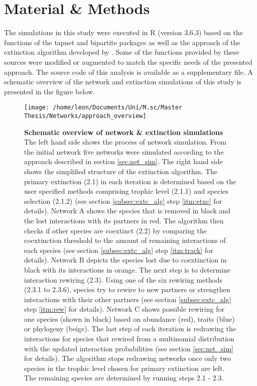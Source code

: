 \documentclass[12pt,a4paper]{article}
\begin{document}
	\section{Material \& Methods}
	The simulations in this study were executed in R \parencite{RCT2020} (version 3.6.3) based on the functions of the tapnet \parencite{Benadi2022} and bipartite \parencite{Dormann2008} packages as well as the approach of the extinction algorithm developed by \citeauthor{Vizentin-Bugoni2019} \parencite{Vizentin-Bugoni2019}. Some of the functions provided by these sources were modified or augmented to match the specific needs of the presented approach. The source code of this analysis is available as a supplementary file. A schematic overview of the network and extinction simulations of this study is presented in the figure below.	
	
	\begin{figure}[H]
	 \texttt{[image: /home/leon/Documents/Uni/M.sc/Master Thesis/Networks/approach\_overview]}
	 \caption[Schematic overview of network \& extinction simulations]{\textbf{Schematic overview of network \& extinction simulations} The left hand side shows the process of network simulation. From the initial network five networks were simulated according to the approach described in section \ref{sec:net_sim}. The right hand side shows the simplified structure of the extinction algorithm. The primary extinction (2.1) in each iteration is determined based on the user specified methods comprising trophic level (2.1.1) and species selection (2.1.2) (see section \ref{subsec:extc_alg} step \ref{itm:etxc} for details). Network A shows the species that is removed in black and the lost interactions with its partners in red. The algorithm then checks if other species are coextinct (2.2) by comparing the coextinction threshold to the amount of remaining interactions of each species (see section \ref{subsec:extc_alg} step \ref{itm:track} for details). Network B depicts the species lost due to coextinction in black with its interactions in orange. The next step is to determine interaction rewiring (2.3). Using one of the six rewiring methods (2.3.1 to 2.3.6), species try to rewire to new partners or strengthen interactions with their other partners (see section \ref{subsec:extc_alg} step \ref{itm:rew} for details). Network C shows possible rewiring for one species (shown in black) based on abundance (red), traits (blue) or phylogeny (beige).
	 The last step of each iteration is redrawing the interactions for species that rewired from a multinomial distribution with the updated interaction probabilities (see section \ref{sec:net_sim} for details). The algorithm stops redrawing networks once only two species in the trophic level chosen for primary extinction are left. The remaining species are determined by running steps 2.1 - 2.3.}
	 \label{fig:extc_alg}
\end{figure}
		\par
\end{document}
